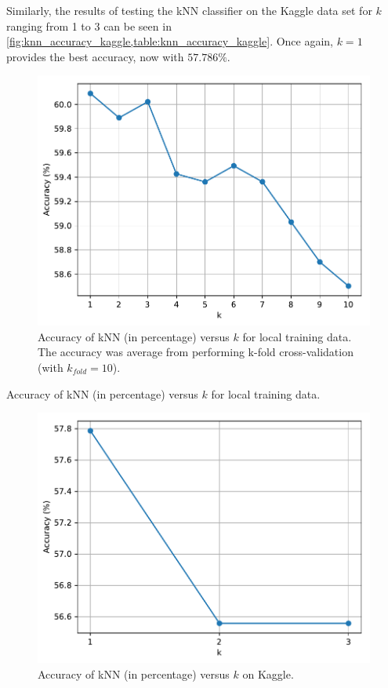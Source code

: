 \documentclass[a4paper,titlepage]{article}
\begin{document}
	Similarly, the results of testing the kNN classifier on the Kaggle data set for $k$ ranging from 1 to 3 can be seen in \cref{fig:knn_accuracy_kaggle,table:knn_accuracy_kaggle}. Once again, $k=1$ provides the best accuracy, now with $57.786\%$.
	
	\begin{figure}[!htb]
		\centering
		\includegraphics[width=\columnwidth]{plots/knn_accuracy_training.pdf}
		\caption
		{Accuracy of kNN (in percentage) versus $k$ for local training data. The accuracy was average from performing k-fold cross-validation (with $k_{fold} = 10$).}
		\label{fig:knn_accuracy_training}
	\end{figure}
	
	\begin{table}[!htb]
		\centering
		\caption{Accuracy of kNN (in percentage) versus $k$ for local training data.}
		\label{table:knn_accuracy_training}
	\end{table}
	
	\begin{figure}[!htb]
		\centering
		\includegraphics[width=\columnwidth]{plots/knn_accuracy_kaggle.pdf}
		\caption
		{Accuracy of kNN (in percentage) versus $k$ on Kaggle.}
		\label{fig:knn_accuracy_kaggle}
	\end{figure}
	
\end{document}
